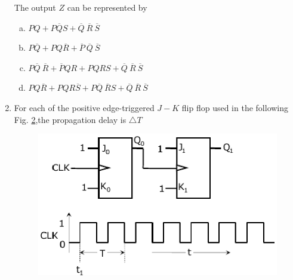 \documentclass[journal,12pt,twocolumn]{IEEEtran}
\begin{document}
\begin{enumerate}
\begin{figure}
\caption{}

\label{fig:32}

\end{figure} 


 
The output $Z$ can be represented by


\begin{enumerate}[(a)]

\item $ PQ+P\overline{Q}S+\overline{Q} \ \overline{R} \ \overline{S} $

\item $ P\overline{Q}+PQ\overline{R}+\overline{P} \ \overline{Q} \ \overline{S} $

\item $ P\overline{Q} \ \overline{R}+\overline{P}QR+PQRS+\overline{Q} \ \overline{R} \ \overline{S} $

\item $ PQ\overline{R}+PQR\overline{S}+P\overline{Q} \ \overline{R}S+\overline{Q} \ \overline{R} \ \overline{S} $

\end{enumerate}


\item For each of the positive edge-triggered $J-K$ flip flop used in the following Fig. \ref{fig:33},the propagation delay is $ \bigtriangleup T$

\begin{figure}

\centering

\includegraphics[width=\columnwidth]{./figs/38.eps}

\caption{}

\label{fig:33}

\end{figure} 
 



\end{enumerate}
\end{document}
